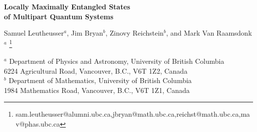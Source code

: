 \documentclass[12pt]{article}
\theoremstyle{definition}
\begin{document}
\begin{titlepage}
\hfill
\vbox{
    \halign{#\hfil         \cr
           } %
      }  %
\vspace*{20mm}
\begin{center}
{\Large \bf Locally Maximally Entangled States \\ of Multipart Quantum Systems}

\vspace*{15mm}
\vspace*{1mm}
Samuel Leutheusser$^a$, Jim Bryan$^b$,  Zinovy Reichstein$^b$, and Mark Van Raamsdonk$^a$
\vspace*{1cm}
\let\thefootnote\relax\footnote{sam.leutheusser@alumni.ubc.ca,jbryan@math.ubc.ca,reichst@math.ubc.ca,mav@phas.ubc.ca}

{${}^{a}$ Department of Physics and Astronomy,
University of British Columbia\\
6224 Agricultural Road,
Vancouver, B.C., V6T 1Z2, Canada\\
${}^{b}$ Department of Mathematics,
University of British Columbia\\
1984 Mathematics Road,
Vancouver, B.C., V6T 1Z1, Canada
}

\vspace*{1cm}
\end{center}
\begin{abstract}


\end{abstract}
\end{titlepage}
\end{document}
